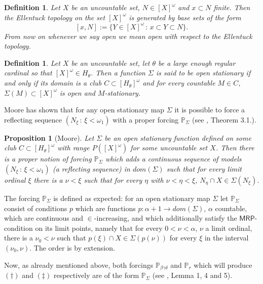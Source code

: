\documentclass[a4paper,11pt]{article}
\newtheorem{proposition}[theorem]{Proposition}
\newtheorem{definition}[theorem]{Definition}
\newcommand{\forceP}{\mathbb{P}}
\newcommand{\MRP}{\mathsf{MRP}}
\begin{document}
\begin{definition}
Let $X$ be an uncountable set, $N \in [X]^{\omega}$ and $x \subset N$ finite. Then the Ellentuck 
topology on the set $[X]^{\omega}$ is generated by base sets of the form
$$ [x,N]:= \{ Y \in [X]^{\omega} \, : \, x \subset Y \subset N \}.$$ From now on whenever we say 
open we mean open with respect to the Ellentuck topology.
\end{definition}

\begin{definition}
Let $X$ be an uncountable set, let $\theta$ be a large enough regular cardinal so that
 $[X]^{\omega} \in H_{\theta}$. Then a function $\Sigma$ is said to be open stationary 
if and only if its domain is a club $C \subset [H_{\theta}]^{\omega}$ and for every 
countable $M \in C$, $\Sigma(M) \subset [X]^{\omega}$ is open and $M$-stationary.
\end{definition}

Moore has shown that for any open stationary map $\Sigma$ it is possible to force a  reflecting sequence $(N_{\xi} \, : \, \xi < \omega_1)$ with a proper forcing $\forceP_{\Sigma}$ (see \cite{Moore}, Theorem 3.1.).

\begin{proposition}[Moore]
Let $\Sigma$ be an open stationary function defined on some club $C \subset [H_{\theta}]^{\omega}$ with range $P([X]^{\omega})$ for some uncountable set $X$. Then there is a proper notion of forcing $\forceP_{\Sigma}$ which adds a continuous sequence of models $(N_{\xi} \, : \, \xi < \omega_1)$ (a reflecting sequence) in $dom(\Sigma)$ 
such that for every limit ordinal $\xi$ there is a $\nu < \xi$ such that for every $\eta$ with 
$\nu < \eta < \xi$, $N_{\eta} \cap X \in \Sigma(N_{\xi})$.
\end{proposition}
The forcing $\forceP_{\Sigma}$ is defined as expected: for an open stationary map $\Sigma$ let $\forceP_{\Sigma}$ consist of conditions $p$ which are  functions $p: \alpha +1 \rightarrow dom(\Sigma)$, $\alpha$ countable, 
which are continuous and $\in$-increasing, and which additionally satisfy the 
$\MRP$-condition on its limit points, namely that for every $0< \nu < \alpha$, $\nu$ a limit ordinal,  
there is a $\nu_0 < \nu$ such that $p(\xi) \cap X \in \Sigma(p(\nu))$ for every 
$\xi$ in the interval $(\nu_0, \nu)$. The order is by extension.

Now, as already mentioned above, both forcings $\forceP_{\beta \gamma \delta}$ and $\forceP_{r}$ which will produce $(\dagger)$ and $(\ddagger)$ respectively are of the form $\forceP_{\Sigma}$ (see \cite{CV}, Lemma 1, 4 and 5).
\end{document}
